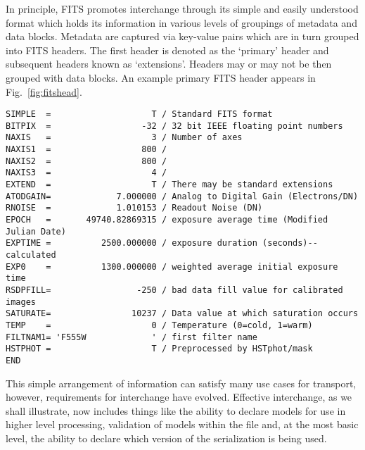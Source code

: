 \documentclass[final,authoryear,5p,times,twocolumn]{elsarticle}
\begin{document}
{{In principle, FITS promotes interchange through its simple and easily
understood format which holds its information in various levels of groupings
of metadata and data blocks. Metadata are captured via key-value pairs which
are in turn grouped into FITS headers. The first header is denoted as the
`primary' header and subsequent headers known as `extensions'. Headers may or
may not be then grouped with data blocks.  An example primary FITS header
appears in Fig.~\ref{fig:fitshead}.


\begin{figure*}
\begin{minipage}{\textwidth}
\begin{verbatim}
SIMPLE  =                    T / Standard FITS format
BITPIX  =                  -32 / 32 bit IEEE floating point numbers
NAXIS   =                    3 / Number of axes
NAXIS1  =                  800 /
NAXIS2  =                  800 /
NAXIS3  =                    4 /
EXTEND  =                    T / There may be standard extensions
ATODGAIN=             7.000000 / Analog to Digital Gain (Electrons/DN)
RNOISE  =             1.010153 / Readout Noise (DN)
EPOCH   =       49740.82869315 / exposure average time (Modified Julian Date)
EXPTIME =          2500.000000 / exposure duration (seconds)--calculated
EXP0    =          1300.000000 / weighted average initial exposure time
RSDPFILL=                 -250 / bad data fill value for calibrated images
SATURATE=                10237 / Data value at which saturation occurs
TEMP    =                    0 / Temperature (0=cold, 1=warm)
FILTNAM1= 'F555W             ' / first filter name
HSTPHOT =                    T / Preprocessed by HSTphot/mask
END
\end{verbatim}
\caption{Representative simple primary header of a FITS file showing
  an assortment of FITS keywords and their associated values. This
  header from 1995 uses a definition of the, now deprecated,
  \texttt{EPOCH} keyword that is at odds with the standard usage of
  the period but the lack of parsable units for the field make it
  hard for a computer parser to understand this.
  Bytes which contain data may or may not follow the \texttt{END} keyword of
  the header.}
\label{fig:fitshead}
\end{minipage}
\end{figure*}


This simple arrangement of information can satisfy many use cases for
transport, however, requirements for interchange have evolved. Effective
interchange, as we shall illustrate, now includes things like the ability to
declare models for use in higher level processing, validation of models within
the file and, at the most basic level, the ability to declare which version of
the serialization is being used.


}}
\end{document}

